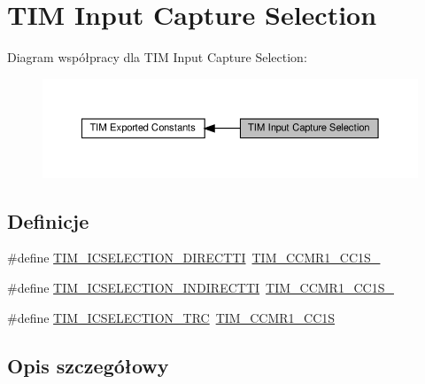 \hypertarget{group___t_i_m___input___capture___selection}{}\section{T\+IM Input Capture Selection}
\label{group___t_i_m___input___capture___selection}
Diagram współpracy dla T\+IM Input Capture Selection\+:\nopagebreak
\begin{figure}[H]
\begin{center}
\leavevmode
\includegraphics[width=350pt]{group___t_i_m___input___capture___selection}
\end{center}
\end{figure}
\subsection*{Definicje}
\begin{DoxyCompactItemize}
\item 
\#define \hyperlink{group___t_i_m___input___capture___selection_gac3be2fd9c576e84e0ebcfc7b3c0773a3}{T\+I\+M\+\_\+\+I\+C\+S\+E\+L\+E\+C\+T\+I\+O\+N\+\_\+\+D\+I\+R\+E\+C\+T\+TI}~\hyperlink{group___peripheral___registers___bits___definition_ga1e4968b5500d58d1aebce888da31eb5d}{T\+I\+M\+\_\+\+C\+C\+M\+R1\+\_\+\+C\+C1\+S\+\_}
\item 
\#define \hyperlink{group___t_i_m___input___capture___selection_gab9754d4318abcd7fe725e3ee2e4496d4}{T\+I\+M\+\_\+\+I\+C\+S\+E\+L\+E\+C\+T\+I\+O\+N\+\_\+\+I\+N\+D\+I\+R\+E\+C\+T\+TI}~\hyperlink{group___peripheral___registers___bits___definition_ga299207b757f31c9c02471ab5f4f59dbe}{T\+I\+M\+\_\+\+C\+C\+M\+R1\+\_\+\+C\+C1\+S\+\_}
\item 
\#define \hyperlink{group___t_i_m___input___capture___selection_ga9e0191bbf1a82dd9150b9283c39276e7}{T\+I\+M\+\_\+\+I\+C\+S\+E\+L\+E\+C\+T\+I\+O\+N\+\_\+\+T\+RC}~\hyperlink{group___peripheral___registers___bits___definition_ga95291df1eaf532c5c996d176648938eb}{T\+I\+M\+\_\+\+C\+C\+M\+R1\+\_\+\+C\+C1S}
\end{DoxyCompactItemize}


\subsection{Opis szczegółowy}


